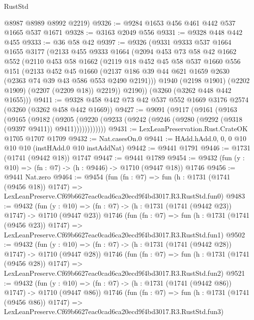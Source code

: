 \begin{lexlean}{RustStd}
\begin{coremodule}
      @8987
      @8989
      @8992
      @2219)
@9326 := @9284 @1653 @456 @461 @442 @537 @1665 @537 @1671
@9328 := @3163 @2049 @556
@9331 := @9328 @448 @442 @455
@9333 := @36 @58 @42
@9397 := @9326
    (@9331
      @9333
      @537
      @1664
      @1655
      @3177
      (@2133
        @455
        @9333
        @1664
        (@2094
          @453
          @73
          @58
          @42
          @1662
          @552
          (@2110
            @453
            @58
            @1662
            (@2119
              @18
              @452
              @45
              @58
              @537
              @1660
              @556
              @151
              (@2133
                @452
                @45
                @1660
                (@2137 @186 @39 @44 @621 @1659 @2630 (@2363 @74 @39 @43 @586 @553 @2490 @2191)))
              @1940
              (@2198 @1901)
              (@2202 @1909)
              (@2207 (@2209 @18))
              @2219))
          @2190))
      (@3260 (@3262 @448 @442 @1655)))
@9411 := @9328 @458 @442 @73 @42 @537 @552 @1669 @3176 @2574 (@3260 (@3262 @458 @442 @1669))
@9427 := @9091
    (@9117
      (@9161
        (@9163
          (@9165
            (@9182
              (@9205
                (@9220 (@9233 (@9242 (@9246 (@9280 (@9292 (@9318 (@9397 @9411)) @9411))))))))))))
@9431 := LexLeanPreservation.Rust.CrateOK @1705 @1707 @1709
@9432 := Nat.casesOn.{0}
@9441 := HAdd.hAdd.{0, 0, 0} @10 @10 @10 (instHAdd.{0} @10 instAddNat)
@9442 := @9441 @1791
@9446 := @1731 (@1741 (@9442 @18)) @1747
@9447 := @9441 @1789
@9454 := @9432 (fun (y : @10) => (fn : @7) -> (h : @9446) -> @1710 (@9447 @18)) @1746
@9456 := @9441 Nat.zero
@9464 := @9454
    (fun (fn : @7) =>
    fun (h : @1731 (@1741 (@9456 @18)) @1747) =>
    LexLeanPreserve.Cf69b6627eac0cad6ca20ecd9f4bd3017.R3.RustStd.fun0)
@9483 := @9432
    (fun (y : @10) => (fn : @7) -> (h : @1731 (@1741 (@9442 @23)) @1747) -> @1710 (@9447 @23))
    @1746
    (fun (fn : @7) =>
    fun (h : @1731 (@1741 (@9456 @23)) @1747) =>
    LexLeanPreserve.Cf69b6627eac0cad6ca20ecd9f4bd3017.R3.RustStd.fun1)
@9502 := @9432
    (fun (y : @10) => (fn : @7) -> (h : @1731 (@1741 (@9442 @28)) @1747) -> @1710 (@9447 @28))
    @1746
    (fun (fn : @7) =>
    fun (h : @1731 (@1741 (@9456 @28)) @1747) =>
    LexLeanPreserve.Cf69b6627eac0cad6ca20ecd9f4bd3017.R3.RustStd.fun2)
@9521 := @9432
    (fun (y : @10) => (fn : @7) -> (h : @1731 (@1741 (@9442 @86)) @1747) -> @1710 (@9447 @86))
    @1746
    (fun (fn : @7) =>
    fun (h : @1731 (@1741 (@9456 @86)) @1747) =>
    LexLeanPreserve.Cf69b6627eac0cad6ca20ecd9f4bd3017.R3.RustStd.fun3)

\end{coremodule}
\end{lexlean}
